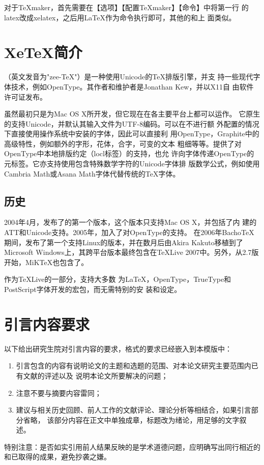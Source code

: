 对于\TeX{}maker，首先需要在【选项】【配置\TeX{}maker】【命令】中将第一行
的latex改成xelatex，之后用\LaTeX{}作为\XeLaTeX{}命令执行即可，其他的和上
面类似。

\section{XeTeX简介}
\XeTeX{}（英文发音为"zee-\TeX{}"）是一种使用Unicode的\TeX{}排版引擎，并支
持一些现代字体技术，例如OpenType。其作者和维护者是Jonathan Kew，并以X11自
由软件许可证发布。

虽然\XeTeX{}最初只是为Mac OS X所开发，但它现在在各主要平台上都可以运作。
它原生的支持Unicode，并默认其输入文件为UTF-8编码。\XeTeX{}可以在不进行额
外配置的情况下直接使用操作系统中安装的字体，因此可以直接利
用OpenType，Graphite中的高级特性，例如额外的字形，花体，合字，可变的文本
粗细等等。\XeTeX{}提供了对OpenType中本地排版约定（locl标签）的支持，也允
许向字体传递OpenType的元标签。它亦支持使用包含特殊数学字符的Unicode字体排
版数学公式，例如使用Cambria Math或Asana Math字体代替传统的\TeX{}字体。


\subsection{历史}
2004年4月，发布了\XeTeX{}的第一个版本，这个版本只支持Mac OS X，并包括了内
建的ATT和Unicode支持。2005年，加入了对OpenType的支持。
在2006年Bacho\TeX{}期间，发布了第一个支持Linux的版本，并在数月后由Akira
Kakuto移植到了Microsoft Windows上，其跨平台版本最终包含在\TeX{}Live
2007中。另外，从2.7版开始，MiK\TeX{}也包含了\XeTeX{}。

作为\TeX{}Live的一部分，\XeTeX{}支持大多数
为\LaTeX{}，OpenType，TrueType和PostScript字体开发的宏包，而无需特别的安
装和设定。


\section{引言内容要求}
以下给出研究生院对引言内容的要求，格式的要求已经嵌入到本模版中：
\begin{enumerate}
\item 引言包含的内容有说明论文的主题和选题的范围、对本论文研究主要范围内已有文献的评述以及
  说明本论文所要解决的问题；
\item 注意不要与摘要内容雷同；
\item 建议与相关历史回顾、前人工作的文献评论、理论分析等相结合，如果引言部分省略，
  该部分内容在正文中单独成章，标题改为绪论，用足够的文字叙述。
\end{enumerate}

\textcolor[rgb]{1.00,0.00,0.00}
{特别注意：是否如实引用前人结果反映的是学术道德问题，应明确写出同行相近的和已取得的成果，避免抄袭之嫌。}
